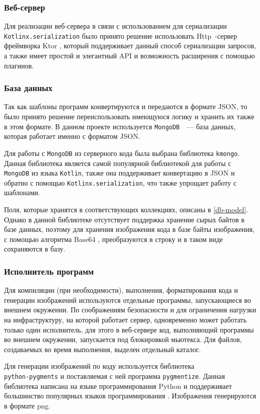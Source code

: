 \subsubsection{Веб-сервер}
Для реализации веб-сервера в связи с использованием для сериализации \texttt{Kotlinx.serialization}
было принято решение использовать Http~-сервер фреймворка Ktor \cite{ktor}, который поддерживает
данный способ сериализации запросов, а также имеет простой и элегантный API и возможность расширения
с помощью плагинов.

\subsubsection{База данных}
\label{db}
Так как шаблоны программ конвертируются и передаются в формате JSON, то было принято решение
переиспользовать имеющуюся логику и хранить их также в этом формате. В данном проекте используется
\texttt{MongoDB}~\cite{mongodb}~--- база данных, которая работает именно с форматом JSON.

Для работы с \texttt{MongoDB} из серверного кода была выбрана библиотека \texttt{kmongo}. Данная
библиотека является самой популярной библиотекой для работы с \texttt{MongoDB} из языка
\texttt{Kotlin}, также она поддерживает конвертацию в JSON и обратно с помощью
\texttt{Kotlinx.serialization}, что также упрощает работу с шаблонами.

Поля, которые хранятся в соответствующих коллекциях, описаны в \ref{db-model}. Однако в
данной библиотеке отсутствует поддержка хранение сырых байтов в базе данных, поэтому для
хранения изображения кода в базе байты изображения, с помощью алгоритма Base64 \cite{rfc4648},
преобразуются в строку и в таком виде сохраняются в базу.

\subsubsection{Исполнитель программ}
Для компиляции (при необходимости), выполнения, форматирования кода и генерации изображений используются
отдельные программы, запускающиеся во внешнем окружении. По соображениям безопасности и для
ограничения нагрузки на инфраструктуру, на которой работает сервер, одновременно может работать
только один исполнитель, для этого в веб-сервере код, выполняющий программы во внешнем окружении,
запускается под блокировкой мьютекса. Для файлов, создаваемых во время выполнения, выделен
отдельный каталог.

Для генерации изображений по коду используется библиотека\\
\texttt{python-pygments} \cite{pygments} и поставляемая
с ней программа \texttt{pygmentize}. Данная библиотека написана на языке программирования
Python \cite{python} и поддерживает большинство популярных языков
программирования \cite{pygments-languages}. Изображения генерируются в формате png.

